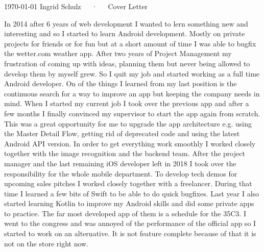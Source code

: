 \documentclass[11pt, a4paper]{awesome-cv}
\begin{document}
\makecvheader[R]

\makecvfooter
  {\today}
  {Ingrid Schulz~~~·~~~Cover Letter}
  {}

\makelettertitle

\begin{cvletter}

In 2014 after 6 years of web development I wanted to lern something new and interesting and so I started to learn Android development. Mostly on private projects for friends or for fun but at a short amount of time I was able to bugfix the wetter.com weather app. After two years of Project Management my frustration of coming up with ideas, planning them but never being allowed to develop them by myself grew. So I quit my job and started working as a full time Android developer. 
On of the things I learned from my last position is the continuous search for a way to improve an app but keeping the company needs in mind.
When I started my current job I took over the previous app and after a few months I finally convinced my supervisor to start the app again from scratch. This was a great opportunity for me to upgrade the app architecture e.g. using the Master Detail Flow, getting rid of deprecated code and using the latest Android API version. In order to get everything work smoothly I worked closely together with the image recognition and the backend team.
After the project manager and the last remaining iOS developer left in 2018 I took over the responsibility for the whole mobile department. To develop tech demos for upcoming sales pitches I worked closely together with a freelancer. During that time I learned a few bits of Swift to be able to do quick bugfixes.
Last year I also started learning Kotlin to improve my Android skills and did some private apps to practice. The far most developed app of them is a schedule for the 35C3. I went to the congress and was annoyed of the performance of the official app so I started to work on an alternative. It is not feature complete because of that it is not on the store right now.


\end{cvletter}
\end{document}

